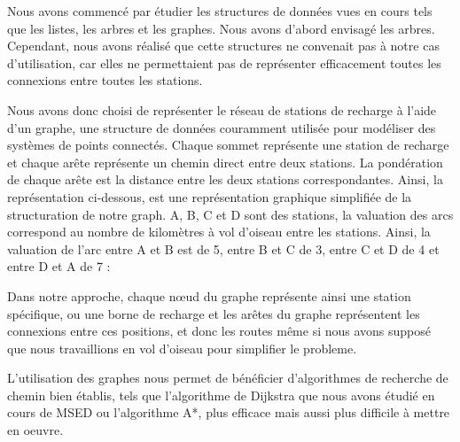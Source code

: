 \documentclass[french,a4paper]{article}
\begin{document}
Nous avons commencé par étudier les structures de données vues en cours tels que les listes, les arbres et les graphes. Nous avons d'abord envisagé 
les arbres. Cependant, nous avons réalisé que cette structures ne convenait pas à notre cas d'utilisation, car elles 
ne permettaient pas de représenter efficacement toutes les connexions entre toutes les stations. 

Nous avons donc choisi de représenter le réseau de stations de recharge à l'aide d'un graphe, une structure de données couramment utilisée pour 
modéliser des systèmes de points connectés. Chaque sommet représente une station de recharge et chaque arête représente un chemin direct 
entre deux stations. La pondération de chaque arête est la distance entre les deux stations correspondantes.
Ainsi, la représentation ci-dessous, est une représentation graphique simplifiée de la structuration de notre graph. A, B, C et D sont des 
stations, la valuation des arcs correspond au nombre de kilomètres à vol d'oiseau entre les stations. Ainsi, la valuation de l'arc entre A et B 
est de 5, entre B et C de 3, entre C et D de 4 et entre D et A de 7 :

\begin{center}
\end{center}

Dans notre approche, chaque nœud du graphe représente ainsi une station spécifique, ou une borne de recharge et les arêtes du graphe représentent 
les connexions entre ces positions, et donc les routes même si nous avons supposé que nous travaillions en vol d'oiseau pour simplifier le probleme.

L'utilisation des graphes nous permet de bénéficier d'algorithmes de recherche de chemin bien établis, tels que l'algorithme de Dijkstra que nous avons
étudié en cours de MSED ou l'algorithme A*, plus efficace mais aussi plus difficile à mettre en oeuvre. 
\end{document}
